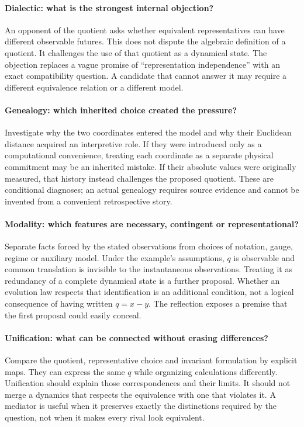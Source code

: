 \paragraph{Dialectic: what is the strongest internal objection?}
An opponent of the quotient asks whether equivalent representatives can have
different observable futures. This does not dispute the algebraic definition of a
quotient. It challenges the use of that quotient as a dynamical state. The
objection replaces a vague promise of ``representation independence'' with an
exact compatibility question. A candidate that cannot answer it may require a
different equivalence relation or a different model.

\paragraph{Genealogy: which inherited choice created the pressure?}
Investigate why the two coordinates entered the model and why their Euclidean
distance acquired an interpretive role. If they were introduced only as a
computational convenience, treating each coordinate as a separate physical
commitment may be an inherited mistake. If their absolute values were originally
measured, that history instead challenges the proposed quotient. These are
conditional diagnoses; an actual genealogy requires source evidence and cannot
be invented from a convenient retrospective story.

\paragraph{Modality: which features are necessary, contingent or representational?}
Separate facts forced by the stated observations from choices of notation, gauge,
regime or auxiliary model. Under the example's assumptions, $q$ is observable and
common translation is invisible to the instantaneous observations. Treating it as
redundancy of a complete dynamical state is a further proposal. Whether an evolution
law respects that identification is an additional condition, not a logical consequence
of having written $q=x-y$. The reflection exposes a premise that the first proposal
could easily conceal.

\paragraph{Unification: what can be connected without erasing differences?}
Compare the quotient, representative choice and invariant formulation by explicit
maps. They can express the same $q$ while organizing calculations differently.
Unification should explain those correspondences and their limits. It should not
merge a dynamics that respects the equivalence with one that violates it. A
mediator is useful when it preserves exactly the distinctions required by the
question, not when it makes every rival look equivalent.

